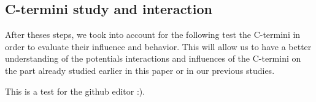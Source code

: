 \documentclass[a4paper]{article}
\begin{document}
\subsection{C-termini study and interaction}

After theses steps, we took into account for the following test the C-termini in order to evaluate their 
influence and behavior. This will allow us to have a better understanding of the potentials interactions and 
influences of the C-termini on the part already studied earlier in this paper or in our previous studies.

This is a test for the github editor :).


%
%
%
%
%
%
%
%
\end{document}
